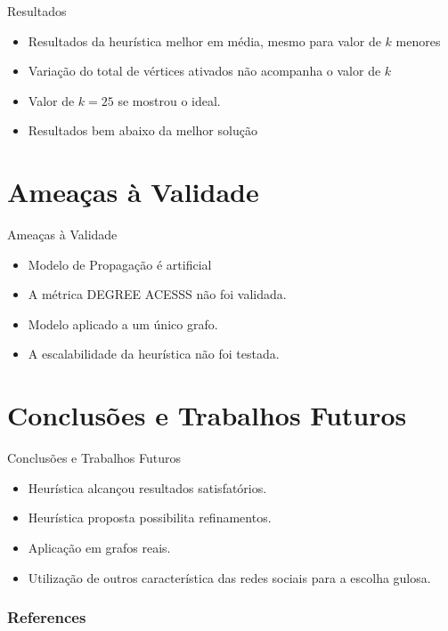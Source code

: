 \documentclass[t,14pt,mathserif,xcolor=table]{beamer}
\begin{document}
\begin{frame}{Resultados}

	\begin{itemize}
		
		\item Resultados da heurística melhor em média, mesmo para valor de $k$ menores
		\item Variação do total de vértices ativados não acompanha o valor de $k$
		\item Valor de $k= 25$ se mostrou o ideal.
		\item Resultados bem abaixo da melhor solução \cite{Hochbaum:1996:ACP:241938.241941} 		
		
	\end{itemize}	


\end{frame}


\section{Ameaças à Validade}

\begin{frame}{Ameaças à Validade}

	\begin{itemize}
		
		\item Modelo de Propagação é artificial
		\item A métrica \textsc{DEGREE ACESSS}{} não foi validada.
		\item Modelo aplicado a um único grafo.
		\item A escalabilidade da heurística não foi testada.		
	\end{itemize}	


\end{frame}




\section{Conclusões e Trabalhos Futuros}

\begin{frame}{Conclusões e Trabalhos Futuros}

	\begin{itemize}
		
		\item Heurística alcançou resultados satisfatórios.
		\item Heurística proposta possibilita refinamentos.
		\item Aplicação em grafos reais.
		\item Utilização de outros característica das redes sociais para a escolha gulosa.			
		
	\end{itemize}	


\end{frame}


\begin{frame}[allowframebreaks]
   \frametitle{References}
   
   
\end{frame}
\end{document}
